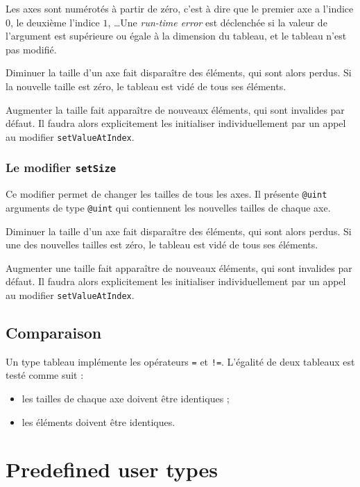 Les axes sont numérotés à partir de zéro, c'est à dire que le premier axe a l'indice $0$, le deuxième l'indice $1$, \dots Une \emph{run-time error} est déclenchée si la valeur de l'argument est supérieure ou égale à la dimension du tableau, et le tableau n'est pas modifié.
 
Diminuer la taille d'un axe fait disparaître des éléments, qui sont alors perdus. Si la nouvelle taille est zéro, le tableau est vidé de tous ses éléments.

Augmenter la taille fait apparaître de nouveaux éléments, qui sont invalides par défaut. Il faudra alors explicitement les initialiser individuellement par un appel au modifier \lstinline[language=galgas]!setValueAtIndex!.




\subsubsection{Le modifier \lstinline[language=galgas]!setSize!}

Ce modifier permet de changer les tailles de tous les axes. Il présente \lstinline[language=galgas]!@uint! arguments de type \lstinline[language=galgas]!@uint! qui contiennent les nouvelles tailles de chaque axe.

Diminuer la taille d'un axe fait disparaître des éléments, qui sont alors perdus. Si une des nouvelles tailles est zéro, le tableau est vidé de tous ses éléments.

Augmenter une taille fait apparaître de nouveaux éléments, qui sont invalides par défaut. Il faudra alors explicitement les initialiser individuellement par un appel au modifier \lstinline[language=galgas]!setValueAtIndex!.


\subsection{Comparaison}

Un type tableau implémente les opérateurs \lstinline[language=galgas]!=! et \lstinline[language=galgas]+!=+. L'égalité de deux tableaux est testé comme suit :
\begin{itemize}
  \item les tailles de chaque axe doivent être identiques ;
  \item les éléments doivent être identiques.
\end {itemize}

\newpage
\section{Predefined user types}

